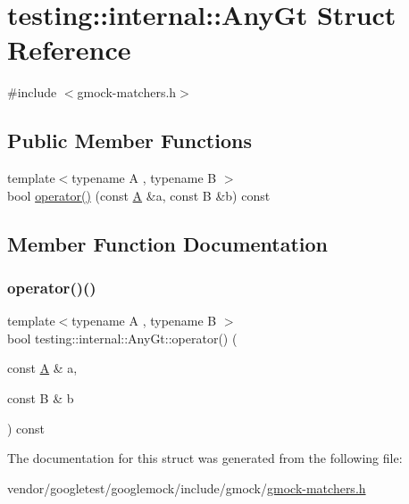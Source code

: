 \hypertarget{structtesting_1_1internal_1_1_any_gt}{}\section{testing\+:\+:internal\+:\+:Any\+Gt Struct Reference}
\label{structtesting_1_1internal_1_1_any_gt}


{\ttfamily \#include $<$gmock-\/matchers.\+h$>$}

\subsection*{Public Member Functions}
\begin{DoxyCompactItemize}
\item 
{\footnotesize template$<$typename A , typename B $>$ }\\bool \hyperlink{structtesting_1_1internal_1_1_any_gt_a710d341cb9f9d1a44ed7233409461dd6}{operator()} (const \hyperlink{namespacetesting_a5e9134d655d2fc9323902348083282e7}{A} \&a, const B \&b) const
\end{DoxyCompactItemize}


\subsection{Member Function Documentation}
\mbox{\label{structtesting_1_1internal_1_1_any_gt_a710d341cb9f9d1a44ed7233409461dd6}} 
\subsubsection{\texorpdfstring{operator()()}{operator()()}}
{\footnotesize\ttfamily template$<$typename A , typename B $>$ \\
bool testing\+::internal\+::\+Any\+Gt\+::operator() (\begin{DoxyParamCaption}\item[{const \hyperlink{namespacetesting_a5e9134d655d2fc9323902348083282e7}{A} \&}]{a,  }\item[{const B \&}]{b }\end{DoxyParamCaption}) const\hspace{0.3cm}{\ttfamily [inline]}}



The documentation for this struct was generated from the following file\+:\begin{DoxyCompactItemize}
\item 
vendor/googletest/googlemock/include/gmock/\hyperlink{gmock-matchers_8h}{gmock-\/matchers.\+h}\end{DoxyCompactItemize}
